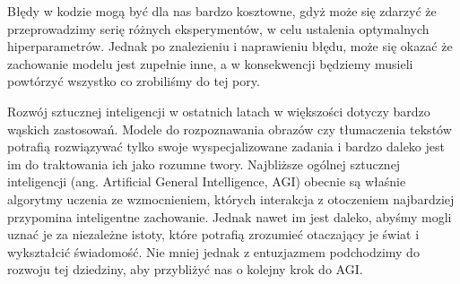 \documentclass[licencjacka]{pracamgr}
\begin{document}
Błędy w kodzie mogą być dla nas bardzo kosztowne, gdyż może się zdarzyć że przeprowadzimy serię różnych eksperymentów, w celu ustalenia optymalnych hiperparametrów. Jednak po znalezieniu i naprawieniu błędu, może się okazać że zachowanie modelu jest zupełnie inne, a w konsekwencji będziemy musieli powtórzyć wszystko co zrobiliśmy do tej pory.

Rozwój sztucznej inteligencji w ostatnich latach w większości dotyczy bardzo wąskich zastosowań. Modele do rozpoznawania obrazów czy tłumaczenia tekstów potrafią rozwiązywać tylko swoje wyspecjalizowane zadania i bardzo daleko jest im do traktowania ich jako rozumne twory. Najbliższe ogólnej sztucznej inteligencji (ang. Artificial General Intelligence, AGI) obecnie są właśnie algorytmy uczenia ze wzmocnieniem, których interakcja z otoczeniem najbardziej przypomina inteligentne zachowanie. Jednak nawet im jest daleko, abyśmy mogli uznać je za niezależne istoty, które potrafią zrozumieć otaczający je świat i wykształcić świadomość. Nie mniej jednak z entuzjazmem podchodzimy do rozwoju tej dziedziny, aby przybliżyć nas o kolejny krok do AGI.






\end{document}
